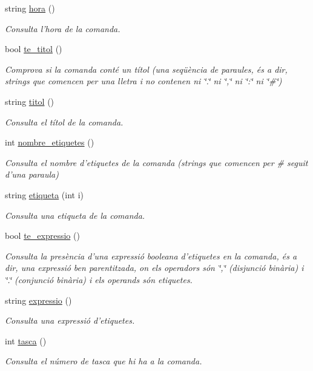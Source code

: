 \begin{DoxyCompactItemize}
string \hyperlink{class_comanda_ae8bca2ad702d3316dc1c53dcab7cac02}{hora} ()
\begin{DoxyCompactList}\small\item\em Consulta l'hora de la comanda. \end{DoxyCompactList}\item 
bool \hyperlink{class_comanda_a5452f5a877d58627cd2bd871cf31b074}{te\-\_\-titol} ()
\begin{DoxyCompactList}\small\item\em Comprova si la comanda conté un títol (una seqüència de paraules, és a dir, strings que comencen per una lletra i no contenen ni \char`\"{}.\char`\"{} ni \char`\"{},\char`\"{} ni \char`\"{}\-:\char`\"{} ni \char`\"{}\#\char`\"{}) \end{DoxyCompactList}\item 
string \hyperlink{class_comanda_ad1cefdda3db389d9ab536a59e2ee907d}{titol} ()
\begin{DoxyCompactList}\small\item\em Consulta el títol de la comanda. \end{DoxyCompactList}\item 
int \hyperlink{class_comanda_a4280b6ae2d435d9c21bbed364cb1db3d}{nombre\-\_\-etiquetes} ()
\begin{DoxyCompactList}\small\item\em Consulta el nombre d'etiquetes de la comanda (strings que comencen per \# seguit d'una paraula) \end{DoxyCompactList}\item 
string \hyperlink{class_comanda_ac80e9a80d16c6bac9a134e431bca1ed0}{etiqueta} (int i)
\begin{DoxyCompactList}\small\item\em Consulta una etiqueta de la comanda. \end{DoxyCompactList}\item 
bool \hyperlink{class_comanda_a81d17f4233e33f3baac7633546c066f0}{te\-\_\-expressio} ()
\begin{DoxyCompactList}\small\item\em Consulta la presència d'una expressió booleana d'etiquetes en la comanda, és a dir, una expressió ben parentitzada, on els operadors són \char`\"{},\char`\"{} (disjunció binària) i \char`\"{}.\char`\"{} (conjunció binària) i els operands són etiquetes. \end{DoxyCompactList}\item 
string \hyperlink{class_comanda_aa3191131592fbf58d20bed1052c31cd1}{expressio} ()
\begin{DoxyCompactList}\small\item\em Consulta una expressió d'etiquetes. \end{DoxyCompactList}\item 
int \hyperlink{class_comanda_a67591051e9c5977c324ad8f8c3ac16e3}{tasca} ()
\begin{DoxyCompactList}\small\item\em Consulta el número de tasca que hi ha a la comanda. \end{DoxyCompactList}\end{DoxyCompactItemize}
